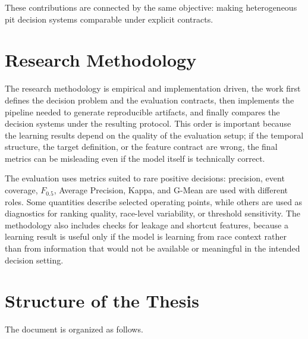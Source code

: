 These contributions are connected by the same objective: making heterogeneous pit decision systems comparable under explicit contracts.

\section{Research Methodology}

The research methodology is empirical and implementation driven, the work first defines the decision problem and the evaluation contracts, then implements the pipeline
needed to generate reproducible artifacts, and finally compares the decision systems under the resulting protocol. This order is important because the learning results
depend on the quality of the evaluation setup; if the temporal structure, the target definition, or the feature contract are wrong, the final metrics can be misleading
even if the model itself is technically correct.

The evaluation uses metrics suited to rare positive decisions: precision, event coverage, $F_{0.5}$, Average Precision, Kappa, and G-Mean are used with different roles.
Some quantities describe selected operating points, while others are used as diagnostics for ranking quality, race-level variability, or threshold sensitivity. The methodology
also includes checks for leakage and shortcut features, because a learning result is useful only if the model is learning from race context rather than from information
that would not be available or meaningful in the intended decision setting.

\section{Structure of the Thesis}

The document is organized as follows.

